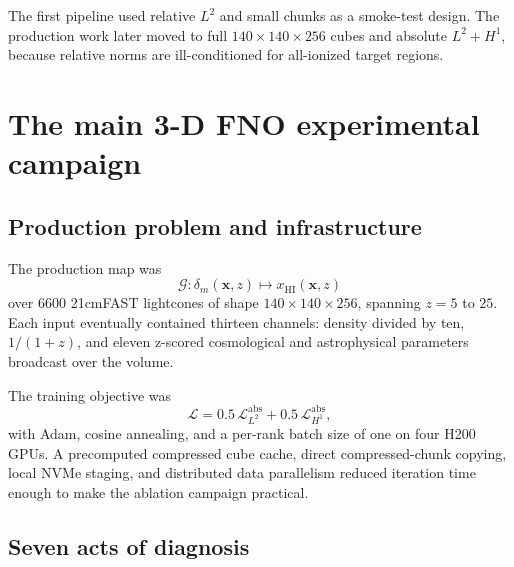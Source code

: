 \documentclass[11pt,a4paper]{article}
\newcommand{\xhi}{x_{\mathrm{HI}}}
\newcommand{\Ltwo}{L^2}
\newcommand{\Hone}{H^1}
\begin{document}
The first pipeline used relative \(\Ltwo\) and small chunks as a smoke-test
design. The production work later moved to full \(140\times140\times256\)
cubes and absolute \(\Ltwo+\Hone\), because relative norms are ill-conditioned
for all-ionized target regions.

\section{The main 3-D FNO experimental campaign}

\subsection{Production problem and infrastructure}

The production map was
\begin{equation}
\mathcal{G}:\delta_m(\mathbf{x},z)\longmapsto\xhi(\mathbf{x},z)
\end{equation}
over \(6600\) 21cmFAST lightcones of shape
\(140\times140\times256\), spanning \(z=5\) to \(25\). Each input eventually
contained thirteen channels: density divided by ten, \(1/(1+z)\), and eleven
z-scored cosmological and astrophysical parameters broadcast over the volume.

The training objective was
\begin{equation}
\mathcal{L}
=0.5\,\mathcal{L}_{\Ltwo}^{\mathrm{abs}}
+0.5\,\mathcal{L}_{\Hone}^{\mathrm{abs}},
\end{equation}
with Adam, cosine annealing, and a per-rank batch size of one on four H200
GPUs. A precomputed compressed cube cache, direct compressed-chunk copying,
local NVMe staging, and distributed data parallelism reduced iteration time
enough to make the ablation campaign practical.

\subsection{Seven acts of diagnosis}
\end{document}
